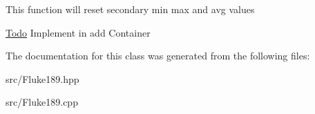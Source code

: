 \label{classFluke_1_1Fluke189QD0Logging_ac5205e2183bdfffcd46229b71baeb3fb}
This function will reset secondary min max and avg values \begin{Desc}
\item[\hyperlink{todo__todo000024}{Todo}]Implement in add Container \end{Desc}


The documentation for this class was generated from the following files:\begin{DoxyCompactItemize}
\item 
src/Fluke189.hpp\item 
src/Fluke189.cpp\end{DoxyCompactItemize}
